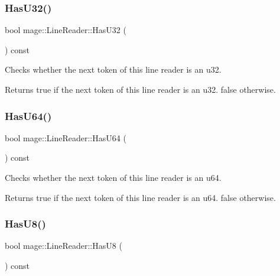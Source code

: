 \subsubsection{\texorpdfstring{Has\+U32()}{HasU32()}}
{\footnotesize\ttfamily bool mage\+::\+Line\+Reader\+::\+Has\+U32 (\begin{DoxyParamCaption}{ }\end{DoxyParamCaption}) const\hspace{0.3cm}{\ttfamily [protected]}}

Checks whether the next token of this line reader is an {\ttfamily u32}.

\begin{DoxyReturn}{Returns}
{\ttfamily true} if the next token of this line reader is an {\ttfamily u32}. {\ttfamily false} otherwise. 
\end{DoxyReturn}
\hypertarget{classmage_1_1_line_reader_a638e055df8a1850e2e5cb9c91f8c54fc}{}\label{classmage_1_1_line_reader_a638e055df8a1850e2e5cb9c91f8c54fc} 
\subsubsection{\texorpdfstring{Has\+U64()}{HasU64()}}
{\footnotesize\ttfamily bool mage\+::\+Line\+Reader\+::\+Has\+U64 (\begin{DoxyParamCaption}{ }\end{DoxyParamCaption}) const\hspace{0.3cm}{\ttfamily [protected]}}

Checks whether the next token of this line reader is an {\ttfamily u64}.

\begin{DoxyReturn}{Returns}
{\ttfamily true} if the next token of this line reader is an {\ttfamily u64}. {\ttfamily false} otherwise. 
\end{DoxyReturn}
\hypertarget{classmage_1_1_line_reader_a2366e6732f404890a54573fd009530aa}{}\label{classmage_1_1_line_reader_a2366e6732f404890a54573fd009530aa} 
\subsubsection{\texorpdfstring{Has\+U8()}{HasU8()}}
{\footnotesize\ttfamily bool mage\+::\+Line\+Reader\+::\+Has\+U8 (\begin{DoxyParamCaption}{ }\end{DoxyParamCaption}) const\hspace{0.3cm}{\ttfamily [protected]}}

